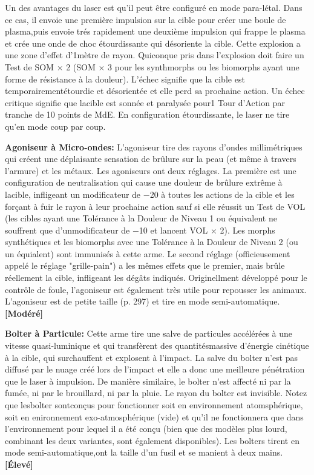 Un des avantages du laser est qu'il peut être configuré en mode para-létal. Dans ce cas, il envoie une première impulsion sur la cible pour créer une boule de plasma,puis envoie trés rapidement une deuxième impulsion qui frappe le plasma et crée une onde de choc étourdissante qui désoriente la cible. Cette explosion a une zone d'effet d'1mètre de rayon. Quiconque pris dans l'explosion doit faire un Test de SOM $\times$ 2  (SOM $\times$ 3 pour les synthmorphs ou les biomorphs ayant une forme de résistance à la douleur). L'échec signifie que la cible est temporairementétourdie et désorientée et elle perd sa prochaine action. Un échec critique signifie que lacible est sonnée et paralysée pour1 Tour d'Action par tranche de 10 points de MdE. En configuration étourdissante, le laser ne tire qu'en mode coup par coup. 

\textbf{Agoniseur à Micro-ondes:} L'agoniseur tire des rayons d'ondes millimétriques qui créent une déplaisante sensation de brûlure sur la peau  (et même à travers l'armure) et les métaux. Les agoniseurs ont deux réglages. La première est une configuration de neutralisation qui cause une douleur de brûlure extrême à lacible, infligeant un modificateur de $-$20 à toutes les actions de la cible et les forçant à fuir le rayon à leur prochaine action sauf si elle réussit un Test de VOL (les cibles ayant une Tolérance à la Douleur de Niveau 1 ou équivalent ne souffrent que d'unmodificateur de $-$10 et lancent VOL $\times$ 2). Les morphs synthétiques et les biomorphs avec une Tolérance à la Douleur de Niveau 2 (ou un équialent) sont immunisés à cette arme. Le second réglage (officieusement appelé le réglage "grille-pain") a les mêmes effets que le premier, mais brûle réellement la cible, infligeant les dégâts indiqués. Originellment développé pour le contrôle de foule, l'agoniseur est également très utile pour repousser les animaux. L'agoniseur est de petite taille (p. 297) et tire en mode semi-automatique. \textbf{[Modéré]} 

\textbf{Bolter à Particule:} Cette arme tire une salve de particules accélérées à une vitesse quasi-luminique et qui transfèrent des quantitésmassive d'énergie cinétique à la cible, qui surchauffent et explosent à l'impact. La salve du bolter n'est pas diffusé par le nuage créé lors de l'impact et elle a donc une meilleure pénétration que le laser à impulsion. De manière similaire, le bolter n'est affecté ni par la fumée, ni par le brouillard, ni par la pluie. Le rayon du bolter est invisible. Notez que lesbolter sontconçus pour fonctionner soit en environnement atomsphérique, soit en enironnement exo-atmosphérique (vide) et qu'il ne fonctionnera que dans l'environnement pour lequel il a été conçu (bien que des modèles plus lourd, combinant les deux variantes, sont également disponibles). Les bolters tirent en mode semi-automatique,ont la taille d'un fusil et se manient à deux mains. \textbf{[Élevé]} 

